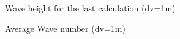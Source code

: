 \begin{figure} [!h]
\centering
{}
 \caption{Wave height for the last calculation (dv=1m)}
\label{figrescalc}
\end{figure}

\begin{figure} [!h]
\centering
{}
 \caption{Average Wave number (dv=1m)}
\label{figkmoy}
\end{figure}


